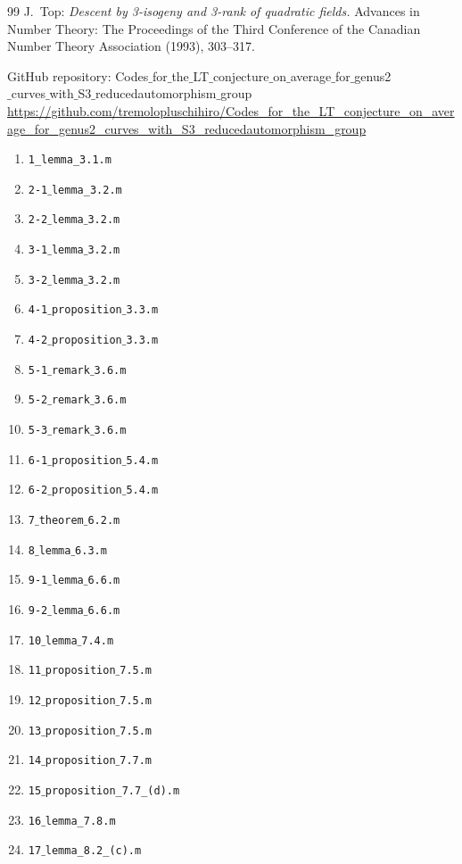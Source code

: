\documentclass[a4paper, 11pt]{article}
\theoremstyle{plain}
\newcommand{\?}{\textcolor{red}{??}}
\begin{document}
\begin{thebibliography}{99}
J.\ Top: \textit{Descent by 3-isogeny and 3-rank of quadratic fields.} 
Advances in Number Theory: The
Proceedings of the Third Conference of the Canadian Number Theory Association (1993),
303--317.

GitHub repository: Codes$\_$for$\_$the$\_$LT$\_$conjecture$\_$on$\_$average$\_$for$\_$genus2\\$\_$curves$\_$with$\_$S3$\_$reducedautomorphism$\_$group\\
\url{https://github.com/tremolopluschihiro/Codes_for_the_LT_conjecture_on_average_for_genus2_curves_with_S3_reducedautomorphism_group}
\begin{enumerate}
\item[] \texttt{1\_lemma\_3.1.m}
\item[] \texttt{2-1$\_$lemma\_3.2.m}
\item[] \texttt{2-2$\_$lemma$\_$3.2.m}
\item[] \texttt{3-1$\_$lemma$\_$3.2.m}
\item[] \texttt{3-2$\_$lemma$\_$3.2.m}
\item[] \texttt{4-1$\_$proposition$\_$3.3.m}
\item[] \texttt{4-2$\_$proposition$\_$3.3.m}
\item[] \texttt{5-1$\_$remark$\_$3.6.m}
\item[] \texttt{5-2$\_$remark$\_$3.6.m}
\item[] \texttt{5-3$\_$remark$\_$3.6.m}
\item[] \texttt{6-1$\_$proposition$\_$5.4.m}
\item[] \texttt{6-2$\_$proposition$\_$5.4.m}
\item[] \texttt{7$\_$theorem$\_$6.2.m}
\item[] \texttt{8$\_$lemma$\_$6.3.m}
\item[] \texttt{9-1$\_$lemma$\_$6.6.m}
\item[] \texttt{9-2$\_$lemma$\_$6.6.m}
\item[] \texttt{10$\_$lemma$\_$7.4.m}
\item[] \texttt{11$\_$proposition$\_$7.5.m}
\item[] \texttt{12$\_$proposition$\_$7.5.m}
\item[] \texttt{13$\_$proposition$\_$7.5.m}
\item[] \texttt{14$\_$proposition$\_$7.7.m}
\item[] \texttt{15$\_$proposition\_7.7\_(d).m}
\item[] \texttt{16$\_$lemma\_7.8.m}
\item[] \texttt{17$\_$lemma\_8.2\_(c).m}
\end{enumerate}
\end{thebibliography}
\end{document}

